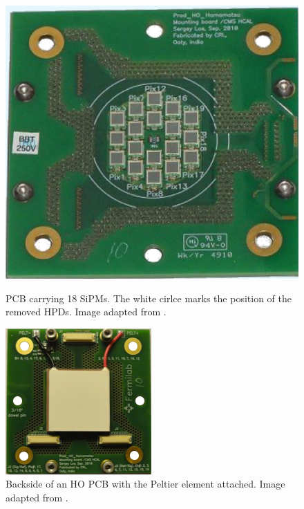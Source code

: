 \begin{figure}[h]
\centering
\begin{minipage}[t]{0.475\textwidth}
\includegraphics[width=\textwidth]{Figures/kuensken/pcbSipm.png}
\caption{PCB carrying 18 SiPMs. The white cirlce marks the position of the removed HPDs. Image adapted from \cite{beniCalor}.}
\label{kuenskensipmPcb}
\end{minipage}
\hspace{1cm}
\begin{minipage}[t]{0.435\textwidth}
\includegraphics[width=\textwidth]{Figures/kuensken/pcbPeltier.png}
\caption{Backside of an HO PCB with the Peltier element attached. Image adapted from \cite{beniCalor}.}
\label{kuenskenpeltier}
\end{minipage}
\end{figure}
